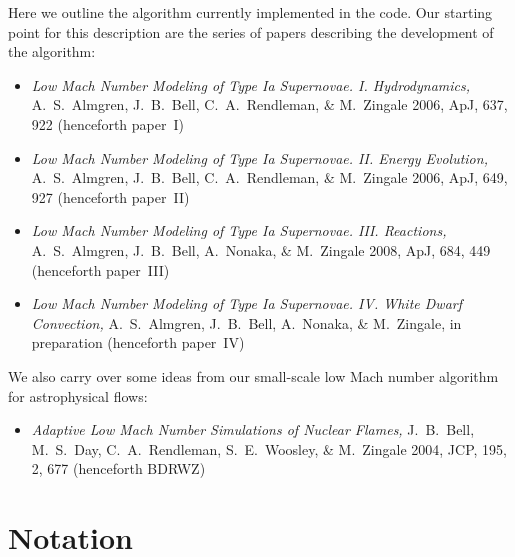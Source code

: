 
Here we outline the algorithm currently implemented in the code.  Our
starting point for this description are the series of papers describing
the development of the algorithm:
\begin{itemize}
\item {\em Low Mach Number Modeling of Type Ia
  Supernovae. I. Hydrodynamics,} A.~S.~Almgren, J.~B.~Bell, 
  C.~A.~Rendleman, \& M.~Zingale 2006, ApJ, 637, 922 (henceforth
  paper~I)
\item {\em Low Mach Number Modeling of Type Ia Supernovae. II. Energy
  Evolution,} A.~S.~Almgren, J.~B.~Bell, C.~A.~Rendleman, \& M.~Zingale
  2006, ApJ, 649, 927 (henceforth paper~II)
\item {\em Low Mach Number Modeling of Type Ia Supernovae. III. Reactions,}
A.~S.~Almgren, J.~B.~Bell, A.~Nonaka, \& M.~Zingale
  2008, ApJ, 684, 449 (henceforth paper~III)
\item {\em Low Mach Number Modeling of Type Ia Supernovae. IV. White Dwarf Convection,}
A.~S.~Almgren, J.~B.~Bell, A.~Nonaka, \& M.~Zingale,
  in preparation (henceforth paper~IV)
\end{itemize}
We also carry over some ideas from our small-scale low Mach number algorithm
for astrophysical flows:
\begin{itemize}
\item {\em Adaptive Low Mach Number Simulations of Nuclear Flames,}
J.~B.~Bell, M.~S.~Day, C.~A.~Rendleman, S.~E.~Woosley, \& M.~Zingale
2004, JCP, 195, 2, 677 (henceforth BDRWZ)
\end{itemize}



\section{Notation}



